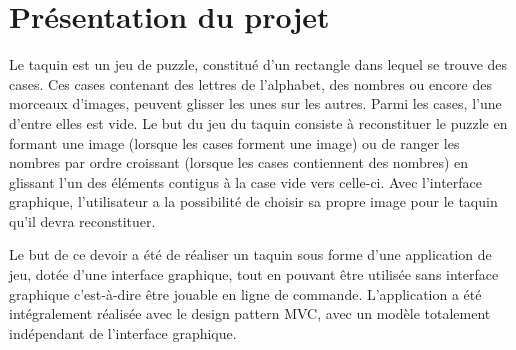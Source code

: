 \chapter{Présentation du projet}

		Le taquin est un jeu de puzzle, constitué d’un rectangle dans lequel se trouve des cases. Ces cases contenant des lettres de l'alphabet,
		des nombres ou encore des morceaux d’images, peuvent glisser les unes sur les autres. Parmi les cases, l’une d'entre elles est vide.
		Le but du jeu du taquin consiste à reconstituer le puzzle en formant une image (lorsque les cases forment une image) ou de ranger les nombres par ordre croissant (lorsque les cases contiennent des nombres) en glissant l'un des éléments contigus à la case vide vers celle-ci. Avec l’interface graphique, l'utilisateur a la possibilité de choisir sa propre image pour le taquin qu’il devra reconstituer.

		Le but de ce devoir a été de réaliser un taquin sous forme d’une application de jeu, dotée d'une interface graphique, tout en pouvant être utilisée sans interface graphique c'est-à-dire être jouable en ligne de commande. L'application a été intégralement réalisée avec le design pattern MVC, avec un modèle totalement indépendant de l'interface graphique.

